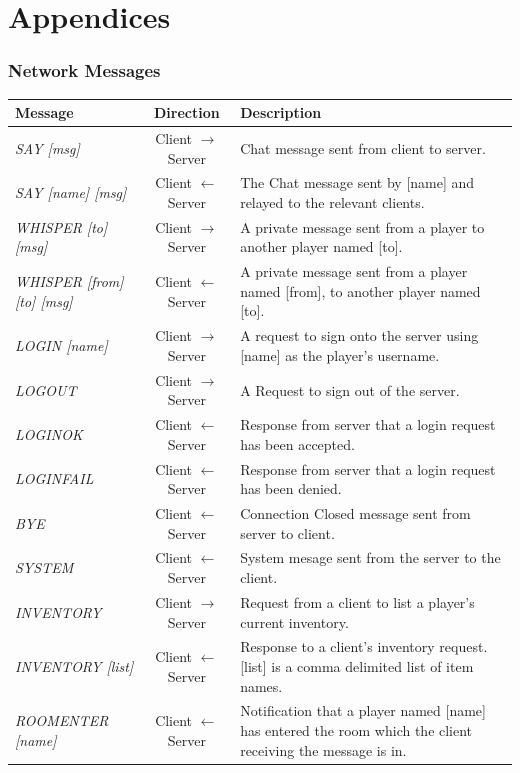 \documentclass[a4paper]{article}
\begin{document}
\part{Appendices}
\begin{appendices}
\section{Network Messages}\label{app:NetworkMessages}
\begin{longtable}{|l|c|p{8 cm}|}
\hline
Message & Direction & Description\\
\hline
\endhead
\textit{SAY [msg]} & Client $\rightarrow$ Server & Chat message sent from client to server.\\
\hline
\textit{SAY [name] [msg]} & Client $\leftarrow$ Server & The Chat message sent by [name] and relayed to the relevant clients.\\
\hline
\textit{WHISPER [to] [msg]} & Client $\rightarrow$ Server & A private message sent from a player to another player named [to].\\
\hline
\textit{WHISPER [from] [to] [msg]} & Client $\leftarrow$ Server & A private message sent from a player named [from], to another player named [to].\\
\hline
\textit{LOGIN [name]} & Client $\rightarrow$ Server & A request to sign onto the server using [name] as the player's username.\\
\hline
\textit{LOGOUT} & Client $\rightarrow$ Server & A Request to sign out of the server.\\
\hline
\textit{LOGINOK} & Client $\leftarrow$ Server & Response from server that a login request has been accepted.\\
\hline
\textit{LOGINFAIL} & Client $\leftarrow$ Server & Response from server that a login request has been denied.\\
\hline
\textit{BYE} & Client $\leftarrow$ Server & Connection Closed message sent from server to client.\\
\hline
\textit{SYSTEM} & Client $\leftarrow$ Server & System mesage sent from the server to the client.\\
\hline
\textit{INVENTORY} & Client $\rightarrow$ Server & Request from a client to list a player's current inventory.\\
\hline
\textit{INVENTORY [list]} & Client $\leftarrow$ Server & Response to a client's inventory request. [list] is a comma delimited list of item names.\\
\hline
\textit{ROOMENTER [name]} & Client $\leftarrow$ Server & Notification that a player named [name] has entered the room which the client receiving the message is in.\\

\end{longtable}
\end{appendices}
\end{document}
